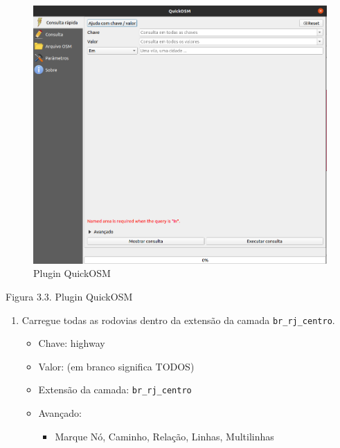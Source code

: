 \documentclass[
]{book}
\providecommand{\tightlist}{%
  \setlength{\itemsep}{0pt}\setlength{\parskip}{0pt}}
\begin{document}
\begin{figure}
\centering
\includegraphics{media/modulo3/quickosm-2.png}
\caption{Plugin QuickOSM}
\end{figure}

Figura 3.3. Plugin QuickOSM

\begin{enumerate}
\def\labelenumi{\arabic{enumi}.}
\setcounter{enumi}{3}
\item
  Carregue todas as rodovias dentro da extensão da camada \texttt{br\_rj\_centro}.

  \begin{itemize}
  \tightlist
  \item
    Chave: highway
  \item
    Valor: (em branco significa TODOS)
  \item
    Extensão da camada: \texttt{br\_rj\_centro}
  \item
    Avançado:

    \begin{itemize}
    \tightlist
    \item
      Marque Nó, Caminho, Relação, Linhas, Multilinhas
    \end{itemize}
  \end{itemize}
\end{enumerate}
\end{document}
